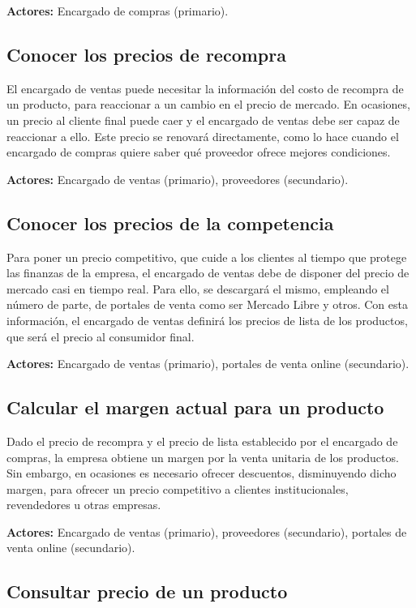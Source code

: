 \documentclass[11pt]{article}
\begin{document}
\textbf{Actores:} Encargado de compras (primario).

\subsection{Conocer los precios de recompra}

El encargado de ventas puede necesitar la información del costo de recompra de un producto,
para reaccionar a un cambio en el precio de mercado.
En ocasiones, un precio al cliente final puede caer y el encargado de ventas debe ser capaz de reaccionar a ello.
Este precio se renovará directamente, 
como lo hace cuando el encargado de compras quiere saber qué proveedor ofrece mejores condiciones.

\textbf{Actores:} Encargado de ventas (primario), proveedores (secundario).

\subsection{Conocer los precios de la competencia}

Para poner un precio competitivo,
que cuide a los clientes al tiempo que protege las finanzas de la empresa,
el encargado de ventas debe de disponer del precio de mercado casi en tiempo real.
Para ello, se descargará el mismo, empleando el número de parte,
de portales de venta como ser Mercado Libre y otros.
Con esta información, 
el encargado de ventas definirá los precios de lista de los productos,
que será el precio al consumidor final.

\textbf{Actores:} Encargado de ventas (primario), portales de venta online (secundario).

\subsection{Calcular el margen actual para un producto}

Dado el precio de recompra y el precio de lista establecido por el encargado de compras,
la empresa obtiene un margen por la venta unitaria de los productos.
Sin embargo,
en ocasiones es necesario ofrecer descuentos, disminuyendo dicho margen,
para ofrecer un precio competitivo a clientes institucionales, revendedores u otras empresas.

\textbf{Actores:} Encargado de ventas (primario), proveedores (secundario), portales de venta online (secundario).

\subsection{Consultar precio de un producto}
\end{document}
